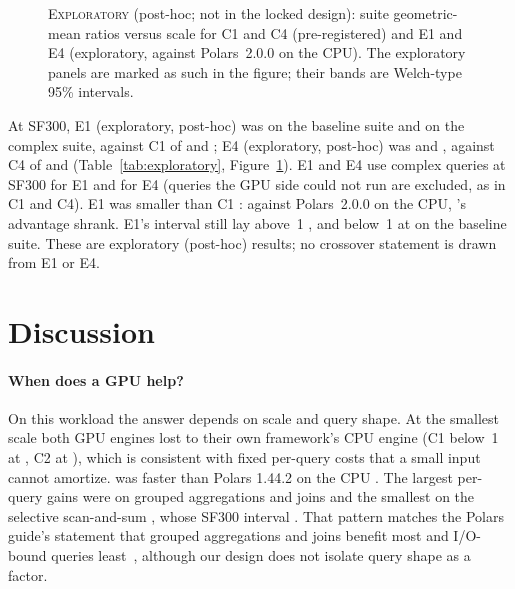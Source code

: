 \documentclass[11pt]{article}
\begin{document}
\begin{figure}[t]
\centering
{}
\caption{\textsc{Exploratory} (post-hoc; not in the locked design): suite
geometric-mean ratios versus scale for C1 and C4 (pre-registered) and E1 and
E4 (exploratory, against Polars~2.0.0 on the CPU). The exploratory panels are
marked as such in the figure; their bands are Welch-type 95\% intervals.
\chartnote}
\label{fig:f2x}
\end{figure}

At SF300, E1 (exploratory, post-hoc) was
 on the baseline suite and
 on the complex suite, against C1 of
 and ; E4
(exploratory, post-hoc) was  and
, against C4 of
 and 
(Table~\ref{tab:exploratory}, Figure~\ref{fig:f2x}). E1 and E4 use
 complex queries at SF300 for E1
and  for E4 (queries the GPU side
could not run are excluded, as in C1 and C4). E1 was smaller than C1
: against
Polars~2.0.0 on the CPU, \polarsgpu{}'s advantage shrank. E1's interval still
lay above~1 , and below~1 at
 on the baseline suite. These are
exploratory (post-hoc) results; no crossover statement is drawn from E1 or
E4.

\section{Discussion}
\label{sec:discussion}

\paragraph{When does a GPU help?} On this workload the answer depends on scale
and query shape. At the smallest scale both GPU engines lost to their own
framework's CPU engine (C1 below~1 at , C2 at
), which is consistent with fixed per-query
costs that a small input cannot amortize. \polarsgpu{} was faster than Polars
1.44.2 on the CPU . The largest per-query gains were on grouped aggregations
and joins and the smallest on the selective scan-and-sum , whose
SF300 interval . That pattern matches the
Polars guide's statement that grouped aggregations and joins benefit most and
I/O-bound queries least~\citep{polars_gpu_guide}, although our design does not
isolate query shape as a factor.
\end{document}
